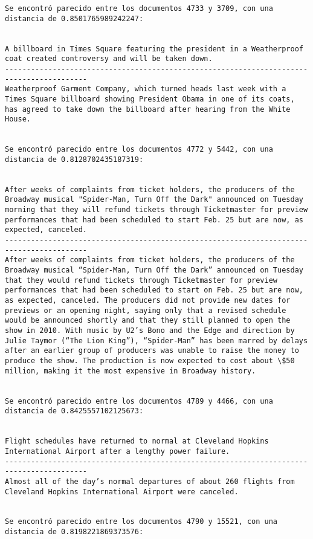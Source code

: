 \documentclass[11pt]{article}
\begin{document}
\begin{Verbatim}[commandchars=\\\{\}]
Se encontró parecido entre los documentos 4733 y 3709, con una distancia de 0.8501765989242247:


A billboard in Times Square featuring the president in a Weatherproof coat created controversy and will be taken down.
-----------------------------------------------------------------------------------------
Weatherproof Garment Company, which turned heads last week with a Times Square billboard showing President Obama in one of its coats, has agreed to take down the billboard after hearing from the White House.


Se encontró parecido entre los documentos 4772 y 5442, con una distancia de 0.8128702435187319:


After weeks of complaints from ticket holders, the producers of the Broadway musical "Spider-Man, Turn Off the Dark" announced on Tuesday morning that they will refund tickets through Ticketmaster for preview performances that had been scheduled to start Feb. 25 but are now, as expected, canceled.
-----------------------------------------------------------------------------------------
After weeks of complaints from ticket holders, the producers of the Broadway musical “Spider-Man, Turn Off the Dark” announced on Tuesday that they would refund tickets through Ticketmaster for preview performances that had been scheduled to start on Feb. 25 but are now, as expected, canceled. The producers did not provide new dates for previews or an opening night, saying only that a revised schedule would be announced shortly and that they still planned to open the show in 2010. With music by U2’s Bono and the Edge and direction by Julie Taymor (“The Lion King”), “Spider-Man” has been marred by delays after an earlier group of producers was unable to raise the money to produce the show. The production is now expected to cost about \$50 million, making it the most expensive in Broadway history.


Se encontró parecido entre los documentos 4789 y 4466, con una distancia de 0.8425557102125673:


Flight schedules have returned to normal at Cleveland Hopkins International Airport after a lengthy power failure.
-----------------------------------------------------------------------------------------
Almost all of the day’s normal departures of about 260 flights from Cleveland Hopkins International Airport were canceled.


Se encontró parecido entre los documentos 4790 y 15521, con una distancia de 0.8198221869373576:



\end{Verbatim}
\end{document}
